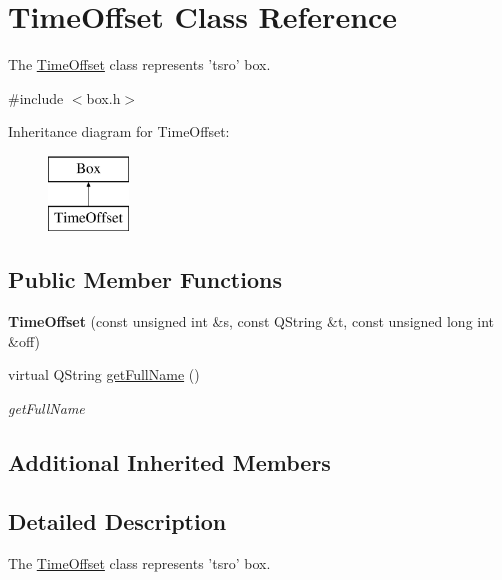 \hypertarget{class_time_offset}{\section{Time\-Offset Class Reference}
\label{class_time_offset}
}


The \hyperlink{class_time_offset}{Time\-Offset} class represents 'tsro' box.  




{\ttfamily \#include $<$box.\-h$>$}

Inheritance diagram for Time\-Offset\-:\begin{figure}[H]
\begin{center}
\leavevmode
\includegraphics[height=2.000000cm]{class_time_offset}
\end{center}
\end{figure}
\subsection*{Public Member Functions}
\begin{DoxyCompactItemize}
\item 
\hypertarget{class_time_offset_ac636b71c53fd4dde459604041ebd06a1}{{\bfseries Time\-Offset} (const unsigned int \&s, const Q\-String \&t, const unsigned long int \&off)}\label{class_time_offset_ac636b71c53fd4dde459604041ebd06a1}

\item 
virtual Q\-String \hyperlink{class_time_offset_a37cfed2c1ed2bb2cc6905c90e064cadb}{get\-Full\-Name} ()
\begin{DoxyCompactList}\small\item\em get\-Full\-Name \end{DoxyCompactList}\end{DoxyCompactItemize}
\subsection*{Additional Inherited Members}


\subsection{Detailed Description}
The \hyperlink{class_time_offset}{Time\-Offset} class represents 'tsro' box. 

